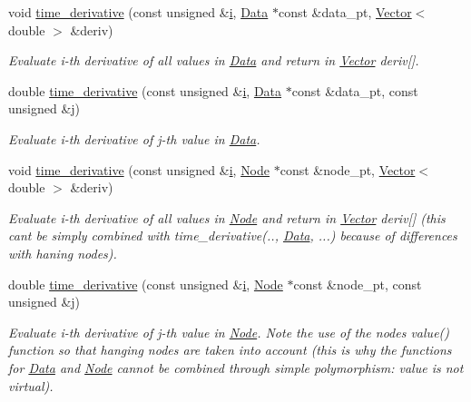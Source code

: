 \begin{DoxyCompactItemize}
void \hyperlink{classoomph_1_1TimeStepper_a802c8b2a2e1933e4e8da30c6d10d1f9c}{time\+\_\+derivative} (const unsigned \&\hyperlink{cfortran_8h_adb50e893b86b3e55e751a42eab3cba82}{i}, \hyperlink{classoomph_1_1Data}{Data} $\ast$const \&data\+\_\+pt, \hyperlink{classoomph_1_1Vector}{Vector}$<$ double $>$ \&deriv)
\begin{DoxyCompactList}\small\item\em Evaluate i-\/th derivative of all values in \hyperlink{classoomph_1_1Data}{Data} and return in \hyperlink{classoomph_1_1Vector}{Vector} deriv\mbox{[}\mbox{]}. \end{DoxyCompactList}\item 
double \hyperlink{classoomph_1_1TimeStepper_ab88e09cb347f024c07d7341ee6ba7389}{time\+\_\+derivative} (const unsigned \&\hyperlink{cfortran_8h_adb50e893b86b3e55e751a42eab3cba82}{i}, \hyperlink{classoomph_1_1Data}{Data} $\ast$const \&data\+\_\+pt, const unsigned \&j)
\begin{DoxyCompactList}\small\item\em Evaluate i-\/th derivative of j-\/th value in \hyperlink{classoomph_1_1Data}{Data}. \end{DoxyCompactList}\item 
void \hyperlink{classoomph_1_1TimeStepper_a3adfcfcf4ba99366d1475df8b4722082}{time\+\_\+derivative} (const unsigned \&\hyperlink{cfortran_8h_adb50e893b86b3e55e751a42eab3cba82}{i}, \hyperlink{classoomph_1_1Node}{Node} $\ast$const \&node\+\_\+pt, \hyperlink{classoomph_1_1Vector}{Vector}$<$ double $>$ \&deriv)
\begin{DoxyCompactList}\small\item\em Evaluate i-\/th derivative of all values in \hyperlink{classoomph_1_1Node}{Node} and return in \hyperlink{classoomph_1_1Vector}{Vector} deriv\mbox{[}\mbox{]} (this can\textquotesingle{}t be simply combined with time\+\_\+derivative(.., \hyperlink{classoomph_1_1Data}{Data}, ...) because of differences with haning nodes). \end{DoxyCompactList}\item 
double \hyperlink{classoomph_1_1TimeStepper_af02a53d7047869cbf0d563272b4de908}{time\+\_\+derivative} (const unsigned \&\hyperlink{cfortran_8h_adb50e893b86b3e55e751a42eab3cba82}{i}, \hyperlink{classoomph_1_1Node}{Node} $\ast$const \&node\+\_\+pt, const unsigned \&j)
\begin{DoxyCompactList}\small\item\em Evaluate i-\/th derivative of j-\/th value in \hyperlink{classoomph_1_1Node}{Node}. Note the use of the node\textquotesingle{}s value() function so that hanging nodes are taken into account (this is why the functions for \hyperlink{classoomph_1_1Data}{Data} and \hyperlink{classoomph_1_1Node}{Node} cannot be combined through simple polymorphism\+: value is not virtual). \end{DoxyCompactList}\item 

\end{DoxyCompactItemize}
